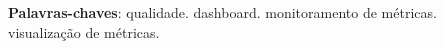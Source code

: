 \begin{resumo}

 \vspace{\onelineskip}
 
    
 \noindent
 \textbf{Palavras-chaves}: qualidade. dashboard. monitoramento de métricas. visualização de métricas.

\end{resumo}
